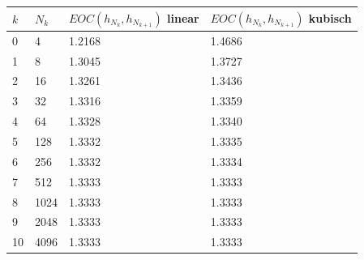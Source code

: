 \documentclass[a4paper, 11pt, ngerman]{scrartcl}
\begin{document}
\begin{center}
	\begin{tabular}{ll|l|l}
		\hline
		$k$ & $N_k$ & $EOC(h_{N_k},h_{N_{k+1}})$ linear & $EOC(h_{N_k},h_{N_{k+1}})$ kubisch\\
		\hline
		0 & 4 & 1.2168 & 1.4686  \\
		\hline
		1 & 8 & 1.3045 & 1.3727\\
		\hline
		2 & 16 & 1.3261 & 1.3436 \\
		\hline
		3 & 32 & 1.3316 & 1.3359 \\
		\hline
		4 & 64 & 1.3328 & 1.3340 \\
		\hline
		5 & 128 & 1.3332 & 1.3335 \\
		\hline
		6 & 256 & 1.3332 & 1.3334 \\
		\hline
		7 & 512 & 1.3333 & 1.3333 \\
		\hline
		8 & 1024 & 1.3333 & 1.3333 \\
		\hline
		9 & 2048 & 1.3333 & 1.3333 \\
		\hline
		10 & 4096 & 1.3333 & 1.3333 \\
		\hline
	\end{tabular}
	

\end{center}
\end{document}
